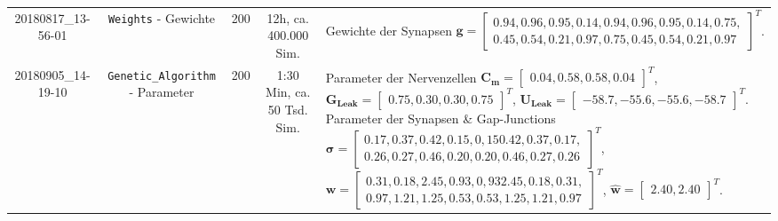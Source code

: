 {\begin{landscape}
\begin{tabular}{c@{\hskip 0.5cm}c@{\hskip 0.5cm}c@{\hskip 0.5cm}c@{\hskip 0.5cm}p{85mm}}
				20180817\_13-56-01		& \texttt{Weights} - Gewichte		& 200			& 12h, ca. 400.000 Sim.		& Gewichte der Synapsen \newline
				$\boldsymbol{g} = \begin{bmatrix}0.94, 0.96, 0.95, 0.14, 0.94, 0.96, 0.95, 0.14, 0.75,\\ 0.45, 0.54, 0.21, 0.97, 0.75, 0.45, 0.54, 0.21, 0.97\end{bmatrix}^T$.\vspace{0.5cm}\\
				
				20180905\_14-19-10		& \texttt{Genetic\_Algorithm} - Parameter& 200			& 1:30 Min, ca. 50 Tsd. Sim.		& Parameter der Nervenzellen \newline
				$\boldsymbol{C_m} = \begin{bmatrix}0.04, 0.58, 0.58, 0.04\end{bmatrix}^T$,\newline
				$\boldsymbol{G_{Leak}} = \begin{bmatrix}0.75, 0.30, 0.30, 0.75\end{bmatrix}^T$,\newline
				$\boldsymbol{U_{Leak}} = \begin{bmatrix}-58.7, -55.6, -55.6, -58.7\end{bmatrix}^T.$ \vspace{0.1cm} \newline
				Parameter der Synapsen \& Gap-Junctions \newline
				$\boldsymbol{\sigma} = \begin{bmatrix}0.17, 0.37, 0.42, 0.15, 0,15 0.42, 0.37, 0.17,\\ 0.26, 0.27, 0.46, 0.20, 0.20, 0.46, 0.27, 0.26\end{bmatrix}^T$,\newline
				$\boldsymbol{w} = \begin{bmatrix}0.31, 0.18, 2.45, 0.93, 0,93 2.45, 0.18, 0.31,\\ 0.97, 1.21, 1.25, 0.53, 0.53, 1.25, 1.21, 0.97\end{bmatrix}^T$,\newline
				$\boldsymbol{\hat{w}} = \begin{bmatrix}2.40, 2.40\end{bmatrix}^T$.\vspace{0.1cm}\\
				
				\bottomrule
				\hline
			\end{tabular}
			\label{tab:app_erg}
		\end{landscape}
		\clearpage%
	}
	


